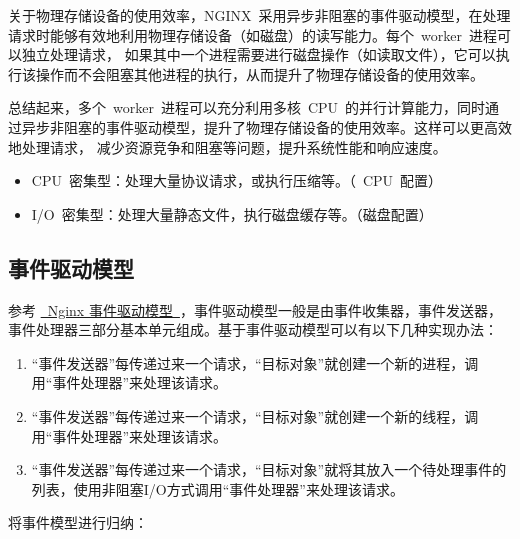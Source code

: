\documentclass[12pt, a4paper]{article} %
\begin{document}
\begin{CJK*}{UTF8}{gbsn}
关于物理存储设备的使用效率，NGINX~采用异步非阻塞的事件驱动模型，在处理请求时能够有效地利用物理存储设备（如磁盘）的读写能力。每个~worker~进程可以独立处理请求，
如果其中一个进程需要进行磁盘操作（如读取文件），它可以执行该操作而不会阻塞其他进程的执行，从而提升了物理存储设备的使用效率。 \par

总结起来，多个~worker~进程可以充分利用多核~CPU~的并行计算能力，同时通过异步非阻塞的事件驱动模型，提升了物理存储设备的使用效率。这样可以更高效地处理请求，
减少资源竞争和阻塞等问题，提升系统性能和响应速度。

\begin{itemize}
    \item CPU~密集型：处理大量协议请求，或执行压缩等。（~CPU~配置）
    \item I/O~密集型：处理大量静态文件，执行磁盘缓存等。（磁盘配置）
\end{itemize}

\subsection{事件驱动模型}

参考 \href{https://www.cnblogs.com/crazymakercircle/p/15411888.html}{~Nginx 事件驱动模型~}，事件驱动模型一般是由事件收集器，事件发送器，
事件处理器三部分基本单元组成。基于事件驱动模型可以有以下几种实现办法：

\begin{enumerate}
    \item “事件发送器”每传递过来一个请求，“目标对象”就创建一个新的进程，调用“事件处理器”来处理该请求。
    \item “事件发送器”每传递过来一个请求，“目标对象”就创建一个新的线程，调用“事件处理器”来处理该请求。
    \item “事件发送器”每传递过来一个请求，“目标对象”就将其放入一个待处理事件的列表，使用非阻塞I/O方式调用“事件处理器”来处理该请求。
\end{enumerate}

将事件模型进行归纳：


\end{CJK*}
\end{document}
